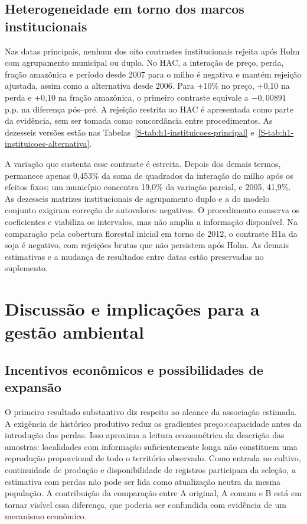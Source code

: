 \subsection{Heterogeneidade em torno dos marcos institucionais}

Nas datas principais, nenhum dos oito contrastes institucionais rejeita após Holm com agrupamento municipal ou duplo. No HAC, a interação de preço, perda, fração amazônica e período desde 2007 para o milho é negativa e mantém rejeição ajustada, assim como a alternativa desde 2006. Para +10\% no preço, +0,10 na perda e +0,10 na fração amazônica, o primeiro contraste equivale a $-0,00891$ p.p. na diferença pós--pré. A rejeição restrita ao HAC é apresentada como parte da evidência, sem ser tomada como concordância entre procedimentos. As dezesseis versões estão nas Tabelas~\ref{S-tab:h1-instituicoes-principal} e~\ref{S-tab:h1-instituicoes-alternativa}.

A variação que sustenta esse contraste é estreita. Depois dos demais termos, permanece apenas 0,453\% da soma de quadrados da interação do milho após os efeitos fixos; um município concentra 19,0\% da variação parcial, e 2005, 41,9\%. As dezesseis matrizes institucionais de agrupamento duplo e a do modelo conjunto exigiram correção de autovalores negativos. O procedimento conserva os coeficientes e viabiliza os intervalos, mas não amplia a informação disponível. Na comparação pela cobertura florestal inicial em torno de 2012, o contraste H1a da soja é negativo, com rejeições brutas que não persistem após Holm. As demais estimativas e a mudança de resultados entre datas estão preservadas no suplemento.

\section{Discussão e implicações para a gestão ambiental}
\label{sec:discussao}
\label{discussao-margens}

\subsection{Incentivos econômicos e possibilidades de expansão}

O primeiro resultado substantivo diz respeito ao alcance da associação estimada. A exigência de histórico produtivo reduz os gradientes preço×capacidade antes da introdução das perdas. Isso aproxima a leitura econométrica da descrição das amostras: localidades com informação suficientemente longa não constituem uma reprodução proporcional de todo o território observado. Como entrada no cultivo, continuidade de produção e disponibilidade de registros participam da seleção, a estimativa com perdas não pode ser lida como atualização neutra da mesma população. A contribuição da comparação entre A original, A comum e B está em tornar visível essa diferença, que poderia ser confundida com evidência de um mecanismo econômico.

